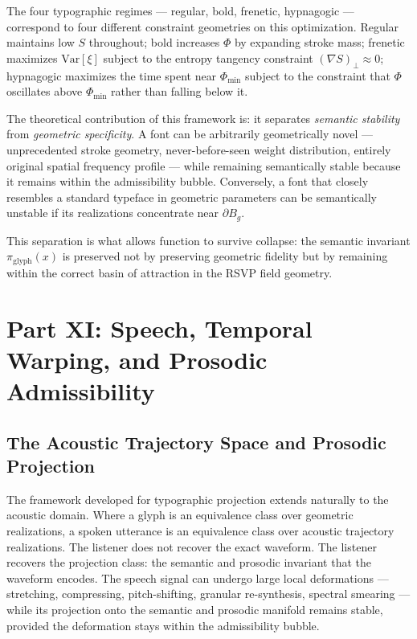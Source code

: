 \documentclass[12pt, a4paper]{article}
\theoremstyle{essaystyle}
\begin{document}
The four typographic regimes --- regular, bold, frenetic, hypnagogic --- correspond
to four different constraint geometries on this optimization. Regular maintains low $S$
throughout; bold increases $\Phi$ by expanding stroke mass; frenetic maximizes
$\mathrm{Var}[\xi]$ subject to the entropy tangency constraint
$(\nabla S)_\perp \approx 0$; hypnagogic maximizes the time spent near $\Phi_{\min}$
subject to the constraint that $\Phi$ oscillates above $\Phi_{\min}$ rather than
falling below it.

The theoretical contribution of this framework is: it separates \emph{semantic
stability} from \emph{geometric specificity}. A font can be arbitrarily geometrically
novel --- unprecedented stroke geometry, never-before-seen weight distribution, entirely
original spatial frequency profile --- while remaining semantically stable because it
remains within the admissibility bubble. Conversely, a font that closely resembles
a standard typeface in geometric parameters can be semantically unstable if its
realizations concentrate near $\partial B_g$.

This separation is what allows function to survive collapse: the semantic invariant
$\pi_{\mathrm{glyph}}(x)$ is preserved not by preserving geometric fidelity but by
remaining within the correct basin of attraction in the RSVP field geometry.

\section{Part XI: Speech, Temporal Warping, and Prosodic Admissibility}

\subsection{The Acoustic Trajectory Space and Prosodic Projection}

The framework developed for typographic projection extends naturally to the acoustic
domain. Where a glyph is an equivalence class over geometric realizations, a spoken
utterance is an equivalence class over acoustic trajectory realizations. The listener
does not recover the exact waveform. The listener recovers the projection class: the
semantic and prosodic invariant that the waveform encodes. The speech signal can
undergo large local deformations --- stretching, compressing, pitch-shifting,
granular re-synthesis, spectral smearing --- while its projection onto the semantic
and prosodic manifold remains stable, provided the deformation stays within the
admissibility bubble.
\end{document}
